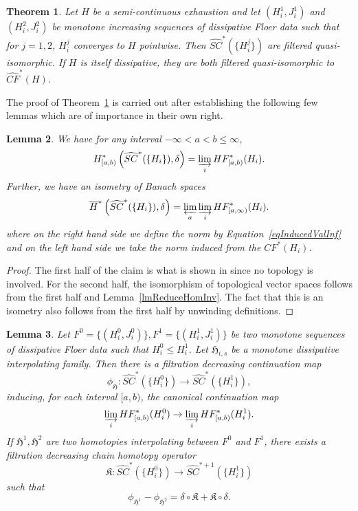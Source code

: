 \documentclass[11pt]{amsart}
\newtheorem{tm}{Theorem}[section]
\newtheorem{lm}[tm]{Lemma}
\theoremstyle{definition}
\theoremstyle{remark}
\begin{document}
\begin{tm}\label{tmOverHFChainLv}
Let $H$ be a semi-continuous exhaustion and let $(H^1_i,J^1_i)$ and $(H^2_i,J^2_i)$ be monotone increasing sequences of dissipative Floer data such that for $j=1,2$, $H^j_i$ converges to $H$ pointwise. Then $\widehat{SC}^*(\{H_i^j\})$ are filtered quasi-isomorphic. If $H$ is itself dissipative, they are both filtered quasi-isomorphic to $\widehat{CF}^*(H)$.
\end{tm}
The proof of Theorem~\ref{tmOverHFChainLv} is carried out after establishing the following few lemmas which are of importance in their own right.
\begin{lm}\label{lmchTruncIsom}
We have for any interval $-\infty<a<b\leq\infty$,
\[
H^*_{[a,b)}\left({\widehat{SC}^*(\{H_i\})},\delta\right)=\varinjlim_iHF^*_{[a,b)}(H_i).
\]
Further, we have an isometry of Banach spaces
\[
\overline{H}^*\left(\widehat{SC}^*(\{H_i\}),\delta\right)=\varprojlim_a\varinjlim_iHF^*_{[a,\infty)}(H_i).
\]
where on the right hand side we define the norm by Equation~\eqref{eqInducedValInf} and on the left hand side we take the norm induced from the $CF^*(H_i)$.
\end{lm}
\begin{proof}
The first half of the claim is what is shown in \cite{abouzaidSeidel2010} since no topology is involved. For the second half, the isomorphism of topological vector spaces follows from the first half and Lemma~\ref{lmReduceHomInv}. The fact that this is an isometry also follows from the first half by unwinding definitions.

\end{proof}
\begin{lm}\label{lmChaLevCont}
Let $F^0=\{(H^0_i,J^0_i)\},F^1=\{(H^1_i,J^1_i)\}$ be two monotone sequences of dissipative Floer data such that $H^0_i\leq H^1_i$. Let $\mathfrak{H}_{i,s}$ be a monotone dissipative interpolating family. Then there is a filtration decreasing continuation map
\[
\phi_{\mathfrak{H}}:\widehat{SC}^*(\{H^0_i\})\to\widehat{SC}^*(\{H^1_i\}),
\]
inducing, for each interval $[a,b)$, the canonical continuation map
\[
\varinjlim_iHF^*_{[a,b)}(H^0_i)\to \varinjlim_iHF^*_{[a,b)}(
H^1_i).
\]
If $\mathfrak{H}^1,\mathfrak{H}^2$ are two homotopies interpolating between $F^0$ and $F^1$, there exists a filtration decreasing chain homotopy operator
\[
\mathfrak{K}:\widehat{SC}^*(\{H^0_i\})\to\widehat{SC}^{*+1}(\{H^1_i\})
\]
such that
\[
\phi_{\mathfrak{H}^1}-\phi_{\mathfrak{H}^2}=\delta\circ\mathfrak{K}+\mathfrak{K}\circ\delta. \]
\end{lm}
\end{document}
